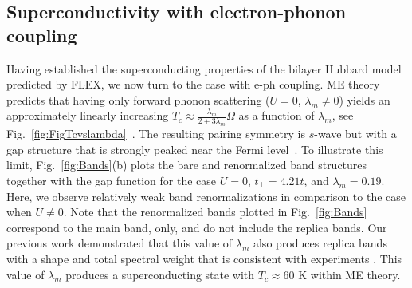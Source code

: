 \documentclass[%
 reprint,
 superscriptaddress,
nofootinbib,
nobibnotes,
 amsmath,amssymb,
 aps,
 prb,
 dvipsnames, 
 floatfix
]{revtex4-2}
\newcommand{\eph}{e-ph}
\begin{document}
\subsection{Superconductivity with electron-phonon coupling}
Having established the superconducting properties of the bilayer Hubbard model predicted by FLEX, we now turn to the case with {\eph} coupling. ME theory predicts that having only forward phonon scattering ($U = 0$, $\lambda_m\ne 0$) yields an approximately linearly increasing $T_c \approx \frac{\lambda_m}{2+3\lambda_m} \Omega$ as a function of $\lambda_m$, see Fig.~\ref{fig:FigTcvslambda}~\cite{Rademaker2016}. The resulting pairing symmetry is $s$-wave but with a gap structure that is strongly peaked near the Fermi level~\cite{WangSUST}. To illustrate this limit, Fig.~\ref{fig:Bands}(b) plots the bare and renormalized band structures together with the gap function for the case $U = 0$, $t_\perp = 4.21t$, and  $\lambda_m = 0.19$. Here, we observe relatively weak band renormalizations in comparison to the case when $U \ne 0$. Note that the renormalized bands plotted in Fig.~\ref{fig:Bands} correspond to the main band, only, and do not include the replica bands. Our previous work \cite{Rademaker2016} demonstrated that this value of $\lambda_m$ also produces replica bands with a shape and total spectral weight that is consistent with experiments \cite{Lee2014}. This value of $\lambda_m$ produces a superconducting state with $T_c \approx 60$ K within ME theory.
\end{document}
